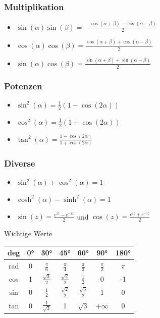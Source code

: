 \documentclass[a4paper,10pt]{article}
\begin{document}
\subsubsection{Multiplikation}
\begin{itemize}
 \item $\sin(\alpha) \sin(\beta) = -\frac{\cos(\alpha + \beta) - \cos(\alpha - \beta)}{2}$
 \item $\cos(\alpha) \cos(\beta) =  \frac{\cos(\alpha + \beta) + \cos(\alpha - \beta)}{2}$
 \item $\sin(\alpha) \cos(\beta) =  \frac{\sin(\alpha + \beta) + \sin(\alpha - \beta)}{2}$
\end{itemize}

\subsubsection{Potenzen}
\begin{itemize}
 \item $\sin^2(\alpha) = \frac{1}{2}(1-\cos(2\alpha))$
 \item $\cos^2(\alpha) = \frac{1}{2}(1+\cos(2\alpha))$
 \item $\tan^2(\alpha) = \frac{1-\cos(2\alpha)}{1+\cos(2\alpha)}$
\end{itemize}

\subsubsection{Diverse}

\begin{itemize}
 \item $\sin^2(\alpha) + \cos^2(\alpha) = 1$
 \item $\cosh^2(\alpha) - \sinh^2(\alpha) = 1$
 \item $\sin(z) = \frac{e^{iz} - e^{-iz}}{2}$ und $\cos(z) = \frac{e^{iz} + e^{-iz}}{2}$
\end{itemize}

\begingroup
\renewcommand*{\arraystretch}{2}

\begin{mainbox}{Wichtige Werte}
  \begin{center} 
    \begin{tabular}{c|cccccc}
      deg & 0° & 30° & 45° & 60° & 90° & 180° \\
      \midrule
      rad & 0 & $\frac{\pi}{6}$ & $\frac{\pi}{4}$ & $\frac{\pi}{3}$ & $\frac{\pi}{2}$ & $\pi$ \\
      cos & 1 & $\frac{\sqrt{3}}{2}$ & $\frac{\sqrt{2}}{2}$ & $\frac{1}{2}$ & 0 & -1 \\
      sin & 0 & $\frac{1}{2}$ & $\frac{\sqrt{2}}{2}$ & $\frac{\sqrt{3}}{2}$ & 1 & 0 \\
      tan & 0 & $\frac{1}{\sqrt{3}}$ & 1 & $\sqrt{3}$ & $+\infty$ & 0 \\
    \end{tabular}
  \end{center}
\end{mainbox}
\end{document}
